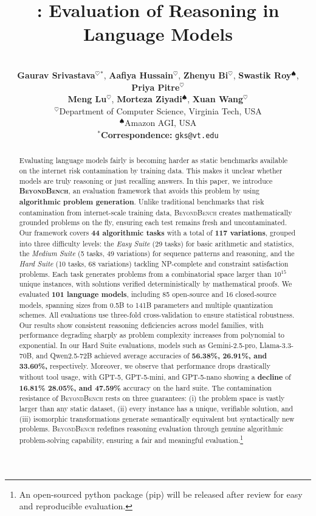 \documentclass{article} %
\title{\our: \rebuttal{Contamination-Resistant} Evaluation of Reasoning in Language Models}
\author{
\\
\vspace{1em}  %
\hspace{-0.5em} \textbf{Gaurav Srivastava}$^{\heartsuit}$$^{*}$, 
\textbf{Aafiya Hussain}$^{\heartsuit}$, 
\textbf{Zhenyu Bi}$^{\heartsuit}$, 
\textbf{Swastik Roy}$^{\spadesuit}$,
\textbf{Priya Pitre}$^{\heartsuit}$\\[-1em]
\textbf{Meng Lu}$^{\heartsuit}$,
\textbf{Morteza Ziyadi}$^{\spadesuit}$,
\textbf{Xuan Wang}$^{\heartsuit}$ \\[0.5em]  %
$^{\heartsuit}$Department of Computer Science, Virginia Tech, USA \\
$^{\spadesuit}$Amazon AGI, USA \\[0.5em]  %
\textbf{$^{*}$Correspondence:} \texttt{gks@vt.edu}
}
\theoremstyle{plain}
\theoremstyle{definition}
\newcommand{\our}{\textsc{BeyondBench}\xspace}
\newcommand{\ourbold}{\textbf{\textsc{BeyondBench}}\xspace}
\newcommand{\rebuttal}[1]{{\color{RebuttalGreen}#1}}
\begin{document}
\maketitle

\begin{abstract}
Evaluating language models fairly is becoming harder as static benchmarks available on the internet risk contamination by training data. This makes it unclear whether models are truly reasoning or just recalling answers. In this paper, we introduce \ourbold, an evaluation framework that avoids this problem by using \textbf{algorithmic problem generation}. Unlike traditional benchmarks that risk contamination from internet-scale training data, \our creates mathematically grounded problems on the fly, ensuring each test remains fresh and uncontaminated. Our framework covers \textbf{44 algorithmic tasks} with a total of \textbf{117 variations}, grouped into three difficulty levels: the \textit{Easy Suite} (29 tasks) for basic arithmetic and statistics, the \textit{Medium Suite} (5 tasks, 49 variations) for sequence patterns and reasoning, and the \textit{Hard Suite} (10 tasks, 68 variations) tackling NP-complete and constraint satisfaction problems. Each task generates problems from a combinatorial space larger than $10^{15}$ unique instances, with solutions verified deterministically by mathematical proofs. We evaluated \textbf{101 language models}, including 85 open-source and 16 closed-source models, spanning sizes from 0.5B to 141B parameters and multiple quantization schemes. \rebuttal{All evaluations use three-fold cross-validation to ensure statistical robustness.} Our results show consistent reasoning deficiencies across model families, with performance degrading sharply as problem complexity increases from polynomial to exponential. In our Hard Suite evaluations, models such as Gemini-2.5-pro, Llama-3.3-70B, and Qwen2.5-72B achieved average accuracies of \textbf{56.38\%, 26.91\%, and 33.60\%,} respectively. Moreover, we observe that performance drops drastically without tool usage, with GPT-5, GPT-5-mini, and GPT-5-nano showing a \textbf{decline} of \textbf{16.81\% 28.05\%, and 47.59\%} accuracy on the hard suite. The contamination resistance of \our rests on three guarantees: (i) the problem space is vastly larger than any static dataset, (ii) every instance has a unique, verifiable solution, and (iii) isomorphic transformations generate semantically equivalent but syntactically new problems. \our redefines reasoning evaluation through genuine algorithmic problem-solving capability, ensuring a fair and meaningful evaluation.\footnote{\rebuttal{An open-sourced python package (pip) will be released after review for easy and reproducible evaluation.}}

\end{abstract}
\end{document}

